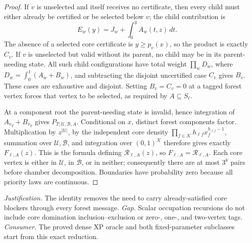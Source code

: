 \documentclass{article}
\begin{document}
\begin{proof}
If \(v\) is unselected and itself receives no certificate, then every child must either already be certified or be selected below \(v\); the child contribution is
\[
 E_w(y)=J_w+\int_0^yA_w(t,z)\,dt.
\]
The absence of a selected core certificate is \(y\ge p_v(x)\), so the product is exactly \(C_v\).  If \(v\) is unselected but valid without its parent, no child may be in its parent-needing state.  All such child configurations have total weight \(\prod_wD_w\), where \(D_w=\int_0^1(A_w+B_w)\), and subtracting the disjoint uncertified case \(C_v\) gives \(B_v\).  These cases are exhaustive and disjoint.  Setting \(B_v=C_v=0\) at a tagged forest vertex forces that vertex to be selected, as required by \(A\subseteq S_\ell\).

At a component root the parent-needing state is invalid, hence integration of \(A_{v_T}+B_{v_T}\) gives \(P_{T;\mathcal U,\mathcal B,A}\).  Conditional on \(x\), distinct forest components factor.  Multiplication by \(z^{|\mathcal U|}\), by the independent core density \(\prod_{f\in\mathcal K}h_{\ell f}x_f^{h_{\ell f}-1}\), summation over \(\mathcal U,\mathcal B\), and integration over \((0,1)^{\mathcal K}\) therefore gives exactly \(F_{\ell,A}(z)\).  This is the formula defining \(\mathcal R_{\ell,A}(z)\), so \(F_{\ell,A}=\mathcal R_{\ell,A}\).  Each core vertex is either in \(\mathcal U\), in \(\mathcal B\), or in neither; consequently there are at most \(3^k\) pairs before chamber decomposition.  Boundaries have probability zero because all priority laws are continuous.
\end{proof}
\par\smallskip\noindent \textit{Justification.} The identity removes the need to carry already-satisfied core blockers through every forest message. \textit{Gap.} Scalar occupation recursions do not include core domination inclusion--exclusion or zero-, one-, and two-vertex tags. \textit{Consumer.} The proved dense XP oracle and both fixed-parameter subclasses start from this exact reduction.
\end{document}
